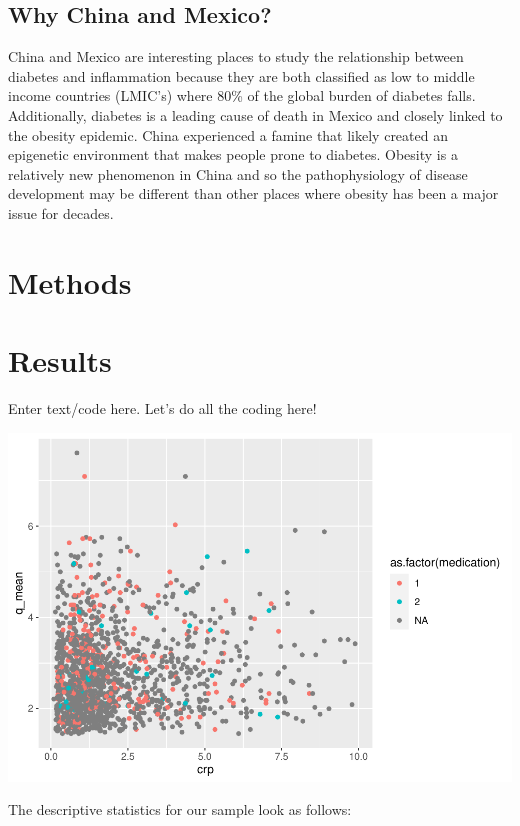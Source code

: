 \documentclass[
  man,floatsintext]{apa6}
\begin{document}
\hypertarget{why-china-and-mexico}{%
\subsection{Why China and Mexico?}\label{why-china-and-mexico}}

China and Mexico are interesting places to study the relationship between diabetes and inflammation because they are both classified as low to middle income countries (LMIC's) where 80\% of the global burden of diabetes falls. Additionally, diabetes is a leading cause of death in Mexico and closely linked to the obesity epidemic. China experienced a famine that likely created an epigenetic environment that makes people prone to diabetes. Obesity is a relatively new phenomenon in China and so the pathophysiology of disease development may be different than other places where obesity has been a major issue for decades.

\hypertarget{methods}{%
\section{Methods}\label{methods}}

\hypertarget{results}{%
\section{Results}\label{results}}

Enter text/code here. Let's do all the coding here!

\includegraphics{Final_Groupof5_files/figure-latex/unnamed-chunk-12-1.pdf}

The descriptive statistics for our sample look as follows:
\end{document}
